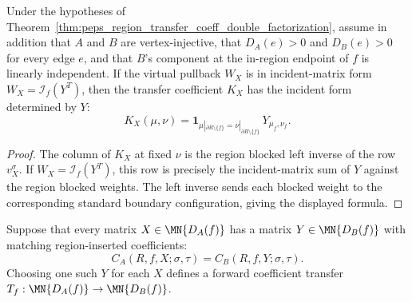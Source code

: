 \begin{theorem}
    \label{thm:peps_region_transfer_coeff_incident_form}
    \leanok
    Under the hypotheses of
    Theorem~\ref{thm:peps_region_transfer_coeff_double_factorization}, assume in
    addition that \(A\) and \(B\) are vertex-injective, that \(D_A(e)>0\) and
    \(D_B(e)>0\) for every edge \(e\), and that \(B\)'s component at the
    in-region endpoint of \(f\) is linearly independent.
    If the virtual pullback \(W_X\) is in incident-matrix form
    \(W_X=\mathcal I_f(Y^T)\), then the transfer coefficient \(K_X\) has the
    incident form determined by \(Y\):
    \[
        K_X(\mu,\nu)=\mathbf 1_{\mu|_{\partial R\setminus\{f\}}
        =\nu|_{\partial R\setminus\{f\}}}\,Y_{\mu_f,\nu_f}.
    \]
\end{theorem}
\begin{proof}\leanok
    The column of \(K_X\) at fixed \(\nu\) is the region blocked left inverse of
    the row \(v_X^\sigma\).  If \(W_X=\mathcal I_f(Y^T)\), this row is precisely the
    incident-matrix sum of \(Y\) against the region blocked weights.  The left
    inverse sends each blocked weight to the corresponding standard boundary
    configuration, giving the displayed formula.
\end{proof}

\begin{definition}
    \label{def:peps_coeff_transfer_map}
    \leanok
    Suppose that every matrix $X\in\MN{D_A(f)}$ has a matrix
    $Y\in\MN{D_B(f)}$ with matching region-inserted coefficients:
    \[
        C_A(R,f,X;\sigma,\tau)
        =
        C_B(R,f,Y;\sigma,\tau).
    \]
    Choosing one such $Y$ for each $X$ defines a forward coefficient transfer
    $T_f:\MN{D_A(f)}\to\MN{D_B(f)}$.
\end{definition}

